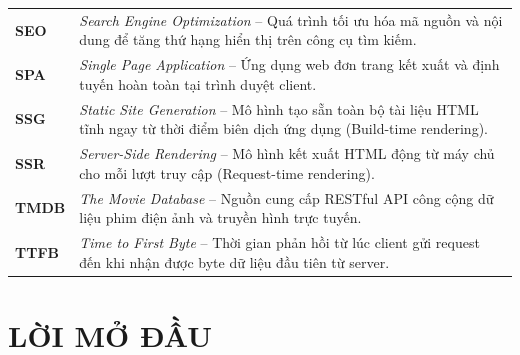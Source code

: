 \documentclass[12pt,a4paper]{extarticle}
\begin{document}
\begin{longtable}{>{\raggedright\arraybackslash}p{2.5cm}>{\raggedright\arraybackslash}p{12.0cm}}
\textbf{SEO} & \textit{Search Engine Optimization} -- Quá trình tối ưu hóa mã nguồn và nội dung để tăng thứ hạng hiển thị trên công cụ tìm kiếm. \\
\textbf{SPA} & \textit{Single Page Application} -- Ứng dụng web đơn trang kết xuất và định tuyến hoàn toàn tại trình duyệt client. \\
\textbf{SSG} & \textit{Static Site Generation} -- Mô hình tạo sẵn toàn bộ tài liệu HTML tĩnh ngay từ thời điểm biên dịch ứng dụng (Build-time rendering). \\
\textbf{SSR} & \textit{Server-Side Rendering} -- Mô hình kết xuất HTML động từ máy chủ cho mỗi lượt truy cập (Request-time rendering). \\
\textbf{TMDB} & \textit{The Movie Database} -- Nguồn cung cấp RESTful API công cộng dữ liệu phim điện ảnh và truyền hình trực tuyến. \\
\textbf{TTFB} & \textit{Time to First Byte} -- Thời gian phản hồi từ lúc client gửi request đến khi nhận được byte dữ liệu đầu tiên từ server. \\
\bottomrule
\end{longtable}
\newpage

{}
\listoftables
\newpage

{}
\listoffigures
\newpage


\section*{LỜI MỞ ĐẦU}
{}
\end{document}
